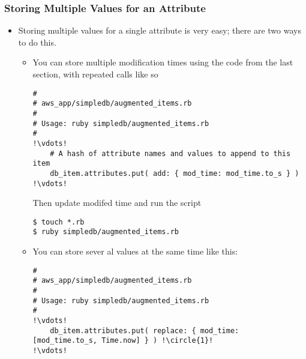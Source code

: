 \documentclass{beamer}
\begin{document}
\begin{frame}
\frametitle{Storing Multiple Values for an Attribute}
\begin{itemize}
\item Storing multiple values for a single attribute is very easy; there are two ways to do
this.
\begin{itemize}
\item You can store multiple modification times using the code from the last section, with repeated
calls like so

\lstset{language=Ruby, style=eclipse}
\begin{lstlisting}[escapechar=!]
#
# aws_app/simpledb/augmented_items.rb
#
# Usage: ruby simpledb/augmented_items.rb
#
!\vdots!
    # A hash of attribute names and values to append to this item
    db_item.attributes.put( add: { mod_time: mod_time.to_s } )
!\vdots!
\end{lstlisting}

Then update modifed time and run the script

\lstset{language=shell}
\begin{lstlisting}
$ touch *.rb
$ ruby simpledb/augmented_items.rb
\end{lstlisting}

\item You can store sever al values at the same time like this:
\begin{lstlisting}[escapechar=!]
#
# aws_app/simpledb/augmented_items.rb
#
# Usage: ruby simpledb/augmented_items.rb
#
!\vdots!
    db_item.attributes.put( replace: { mod_time: [mod_time.to_s, Time.now] } ) !\circle{1}!
!\vdots!
\end{lstlisting}


\end{itemize}
\end{itemize}
\end{frame}
\end{document}

